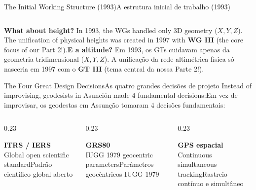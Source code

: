 \documentclass[aspectratio=169,11pt]{beamer}
\newcommand{\tr}[2]{\ifEN#2\else#1\fi}
\begin{document}
\begin{frame}{\tr{A estrutura inicial de trabalho (1993)}{The Initial Working Structure (1993)}}
\begin{columns}[onlytextwidth]
  \end{columns}
  \vspace{0.25cm}
  \begin{ideia}
    \scriptsize \tr{\textbf{E a altitude?} Em 1993, os GTs cuidavam apenas da geometria tridimensional
    ($X, Y, Z$). A unificação da rede altimétrica física só nasceria em 1997 com o \textbf{GT III}
    (tema central da nossa Parte 2!).}{\textbf{What about height?} In 1993, the WGs handled only
    3D geometry ($X,Y,Z$). The unification of physical heights was created in 1997 with \textbf{WG III}
    (the core focus of our Part 2!).}
  \end{ideia}
\end{frame}

\begin{frame}{\tr{As quatro grandes decisões de projeto}{The Four Great Design Decisions}}
  \centering
  \small \tr{Em vez de improvisar, os geodestas em Assunção tomaram 4 decisões fundamentais:}{Instead
  of improvising, geodesists in Asunción made 4 fundamental decisions:}\\[0.3cm]
  \begin{columns}[onlytextwidth]
    \begin{column}{0.23\textwidth}
      \begin{tcolorbox}[colback=mStoneLight, colframe=mTeal, title=\centering \scriptsize \tr{1. O Sistema}{1. The System}]
        \centering \tiny \textbf{ITRS / IERS}\\[2pt]
        \tr{Padrão científico global aberto}{Global open scientific standard}
      \end{tcolorbox}
    \end{column}
    \begin{column}{0.23\textwidth}
      \begin{tcolorbox}[colback=mStoneLight, colframe=mIndigo, title=\centering \scriptsize \tr{2. O Elipsoide}{2. The Ellipsoid}]
        \centering \tiny \textbf{GRS80}\\[2pt]
        \tr{Parâmetros geocêntricos IUGG 1979}{IUGG 1979 geocentric parameters}
      \end{tcolorbox}
    \end{column}
    \begin{column}{0.23\textwidth}
      \begin{tcolorbox}[colback=mStoneLight, colframe=mAmber, title=\centering \scriptsize \tr{3. A Técnica}{3. The Technique}]
        \centering \tiny \textbf{GPS espacial}\\[2pt]
        \tr{Rastreio contínuo e simultâneo}{Continuous simultaneous tracking}

\end{tcolorbox}
\end{column}
\end{columns}
\end{frame}
\end{document}
